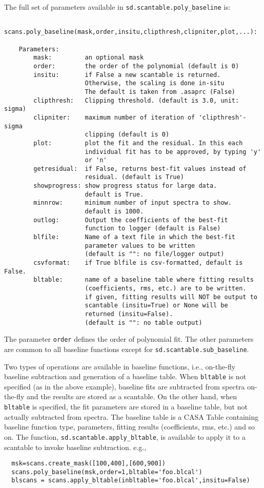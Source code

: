The full set of parameters available in {\tt sd.scantable.poly\_baseline} is:
\small
\begin{verbatim}
  scans.poly_baseline(mask,order,insitu,clipthresh,clipniter,plot,...):

    Parameters:
        mask:         an optional mask
        order:        the order of the polynomial (default is 0)
        insitu:       if False a new scantable is returned.
                      Otherwise, the scaling is done in-situ
                      The default is taken from .asaprc (False)
        clipthresh:   Clipping threshold. (default is 3.0, unit: sigma)
        clipniter:    maximum number of iteration of 'clipthresh'-sigma 
                      clipping (default is 0)
        plot:         plot the fit and the residual. In this each
                      individual fit has to be approved, by typing 'y'
                      or 'n'
        getresidual:  if False, returns best-fit values instead of
                      residual. (default is True)
        showprogress: show progress status for large data.
                      default is True.
        minnrow:      minimum number of input spectra to show.
                      default is 1000.
        outlog:       Output the coefficients of the best-fit
                      function to logger (default is False)
        blfile:       Name of a text file in which the best-fit
                      parameter values to be written
                      (default is "": no file/logger output)
        csvformat:    if True blfile is csv-formatted, default is False.
        bltable:      name of a baseline table where fitting results
                      (coefficients, rms, etc.) are to be written.
                      if given, fitting results will NOT be output to
                      scantable (insitu=True) or None will be 
                      returned (insitu=False). 
                      (default is "": no table output)
\end{verbatim}
\normalsize

The parameter {\tt order} defines the order of polynomial fit.
The other parameters are common to all baseline functions except for 
{\tt sd.scantable.sub\_baseline}.

Two types of operations are available in baseline functions, i.e.,
on-the-fly baseline subtraction and generation of a baseline table. 
When {\tt bltable} is not specified (as in the above example), 
baseline fits are subtracted from spectra on-the-fly and the results 
are stored as a scantable.
On the other hand, when {\tt bltable} is specified, the fit parameters
are stored in a baseline table, but not actually subtracted from spectra.
The baseline table is a CASA Table containing baseline function type, 
parameters, fitting results (coefficients, rms, etc.) and so on. 
The function, {\tt sd.scantable.apply\_bltable}, is available to apply
it to a scantable to invoke baseline subtraction. e.g.,
\small
\begin{verbatim}
  msk=scans.create_mask([100,400],[600,900])
  scans.poly_baseline(msk,order=1,bltable='foo.blcal')
  blscans = scans.apply_bltable(inbltable='foo.blcal',insitu=False)
\end{verbatim}
\normalsize


